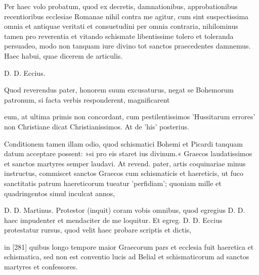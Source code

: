 Per haec volo probatum, quod ex decretis, damnationibus, approbationibus recentioribus ecclesiae Romanae nihil contra me agitur, cum sint suspectissima omnia et antiquae veritati et consuetudini per omnia contraria, nihilominus tamen pro reverentia et vitando schismate libentissime tolero et toleranda persuadeo, modo non tanquam iure divino tot sanctos praecedentes damnemus. Haec habui, quae dicerem de articulis.

D. D. Eccius.

Quod reverendus pater, honorem suum excusaturus, negat se Bohemorum patronum, si facta verbis responderent, magnificarent

eum, at ultima primis non concordant, cum pestilentissimos 'Hussitarum errores' non Christiane dicat Christianissimos. At de 'his' posterius.

Conditionem tamen illam odio, quod schismatici Bohemi et Picardi tanquam datum acceptare possent: »si pro eis staret ius divinum.« Graecos laudatissimos et sanctos martyres semper laudavi. At revend. pater, artis coquinariae minus instructus, commiscet sanctos Graecos cum schismaticis et haereticis, ut fuco sanctitatis patrum haereticorum tueatur 'perfidiam'; quoniam mille et quadringentos simul inculcat annos,

D. D. Martinus. Protestor (inquit) coram vobis omnibus\apnota{37a}{[M U add et publice.}, quod egregius D. D. haec impudenter et mendaciter de me loquitur. Et egreg. D. D. Eccius protestatur rursus, quod velit haec probare scriptis et dictis,

in [281] quibus longo tempore maior Graecorum pars et ecclesia fuit haeretica et schismatica, sed non est conventio lucis ad Belial et schismaticorum ad sanctos martyres et confessores.

